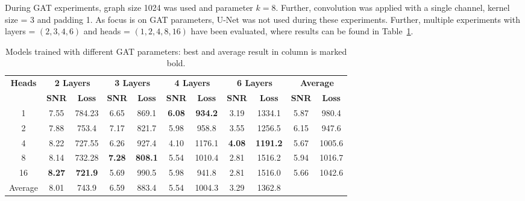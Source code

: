 During GAT experiments, graph size 1024 was used and parameter $k=8$.
Further, convolution was applied with a single channel, kernel size = 3 and padding 1.
As focus is on GAT parameters, U-Net was not used during these experiments.
Further, multiple experiments with layers = $(2,3,4,6)$ and heads = $(1,2,4,8,16)$ have been evaluated, 
where results can be found in Table~\ref{tab:small_gat_results}.

\begin{table}[H]
  \centering
  \begin{tabular}{c|cc|cc|cc|cc|cc}
    \toprule
    \textbf{Heads} & \multicolumn{2}{c|}{\footnotesize \textbf{2 Layers}} & \multicolumn{2}{c|}{\footnotesize \textbf{3 Layers}} & \multicolumn{2}{c|}{\footnotesize \textbf{4 Layers}} & \multicolumn{2}{c|}{\footnotesize \textbf{6 Layers}} & \multicolumn{2}{c}{\footnotesize \textbf{Average}} \\
                   & \textbf{SNR} & \textbf{Loss} & \textbf{SNR} & \textbf{Loss} & \textbf{SNR} & \textbf{Loss} & \textbf{SNR} & \textbf{Loss} & \textbf{SNR} & \textbf{Loss} \\ 
    \midrule
    1    &  7.55	         & 784.23          & 6.65	          & 869.1          & \textbf{6.08}	& \textbf{934.2}  & 3.19	        & 1334.1          & 5.87 & 980.4 \\ \hline
    2    &  7.88	         & 753.4           & 7.17	          & 821.7          & 5.98	          & 958.8           & 3.55	        & 1256.5          & 6.15 & 947.6 \\ \hline
    4    &  8.22	         & 727.55          & 6.26	          & 927.4          & 4.10	          & 1176.1          & \textbf{4.08}	& \textbf{1191.2} & 5.67 & 1005.6 \\ \hline
    8    &  8.14 	         & 732.28          & \textbf{7.28}	& \textbf{808.1} & 5.54	          & 1010.4          & 2.81	        & 1516.2          & 5.94 & 1016.7 \\ \hline
    16   &  \textbf{8.27}  & \textbf{721.9}  & 5.69	          & 990.5          & 5.98	          & 941.8           & 2.81	        & 1516.0          & 5.66 & 1042.6 \\ \hline
    
    Average  &  8.01 & 743.9 & 6.59 & 883.4 & 5.54 & 1004.3 & 3.29 & 1362.8   \\ 
    \midrule
  \end{tabular}
  \caption{Models trained with different GAT parameters: best and average result in column is marked bold. }
  \label{tab:small_gat_results}
\end{table}


